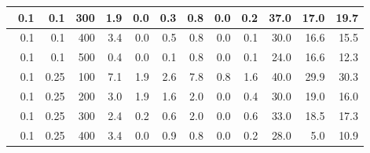 \begin{longtable}{|r|r|r|r|r|r|r|r|r|r|r|r|}
        \hline \
        0.1                            & 0.1                     & 300                       & 1.9                       & 0.0                       & 0.3                       & 0.8                       & 0.0                       & 0.2                       & 37.0                      & 17.0                      & 19.7                      \\
        \hline \
        0.1                            & 0.1                    & 400                       & 3.4                       & 0.0                       & 0.5                       & 0.8                       & 0.0                       & 0.1                       & 30.0                      & 16.6                      & 15.5                      \\
        \hline \
        0.1                            & 0.1                    & 500                       & 0.4                       & 0.0                       & 0.1                       & 0.8                       & 0.0                       & 0.1                       & 24.0                      & 16.6                      & 12.3                      \\
        \hline \
        0.1                            & 0.25                    & 100                       & 7.1                       & 1.9                       & 2.6                       & 7.8                       & 0.8                       & 1.6                       & 40.0                      & 29.9                      & 30.3                      \\
        \hline \
        0.1                            & 0.25                    & 200                       & 3.0                       & 1.9                       & 1.6                       & 2.0                       & 0.0                       & 0.4                       & 30.0                      & 19.0                       & 16.0                      \\
        \hline \
        0.1                            & 0.25                    & 300                       & 2.4                       & 0.2                       & 0.6                       & 2.0                       & 0.0                       & 0.6                       & 33.0                      & 18.5                      & 17.3                      \\
        \hline \
        0.1                            & 0.25                     & 400                       & 3.4                       & 0.0                       & 0.9                       & 0.8                       & 0.0                       & 0.2                       & 28.0                      & 5.0                      & 10.9                      \\

\end{longtable}

